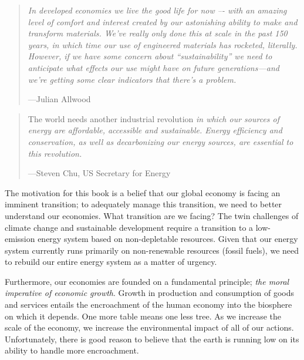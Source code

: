 \begin{quotation}
	\emph{In developed economies we live the good life for now –-
	with an amazing level of comfort and interest 
	created by our astonishing ability to 
	make and transform materials. 
	We've really only done this at scale in the past 150 years, 
	in which time our use of engineered materials has rocketed, 
	literally. 
	However, if we have some concern about ``sustainability''
	we need to anticipate what effects our use might have 
	on future generations---and we're getting 
	some clear indicators that there's a 
	problem.}~\cite[p.~3]{allwood2012sustainable}

	\hfill---Julian Allwood
\end{quotation}

\begin{quotation}
	The world needs another industrial revolution 
	\emph{in which our sources of energy are affordable, 
	accessible and sustainable. 
	Energy efficiency and conservation, 
	as well as decarbonizing our energy sources, 
	are essential to this revolution.}~\cite[p.~294]{Chu2012}

	\hfill---Steven Chu, US Secretary for Energy
\end{quotation}

The motivation for this book
is a belief that our global economy is
facing an imminent transition;
to adequately manage this transition,
we need to better understand our economies.
What transition are we facing? 
The twin challenges of climate change and 
sustainable development require a transition to a
low-emission energy system based on 
non-depletable resources. 
Given that our energy system currently runs
primarily on non-renewable resources (fossil fuels),
we need to rebuild our entire energy
system as a matter of urgency.

Furthermore,
our economies are founded on a fundamental principle;
\emph{the moral imperative of economic growth}.\cite{Daly1995}
Growth in production and consumption of goods and services
entails the encroachment of the human economy into the
biosphere on which it depends.
One more table means one less tree.
As we increase the scale of the economy,
we increase the environmental impact of all of our actions.
Unfortunately, there is good reason to believe that the earth 
is running low on its ability to handle more encroachment.\cite{UNMEA2005}

